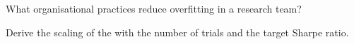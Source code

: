 \begin{interviewq}\label{iq:rs:overfitting:5}
What organisational practices reduce overfitting in a research team?
\end{interviewq}

\begin{interviewq}\label{iq:rs:overfitting:6}
Derive the scaling of the  with the number of trials and the target Sharpe ratio.
\end{interviewq}
